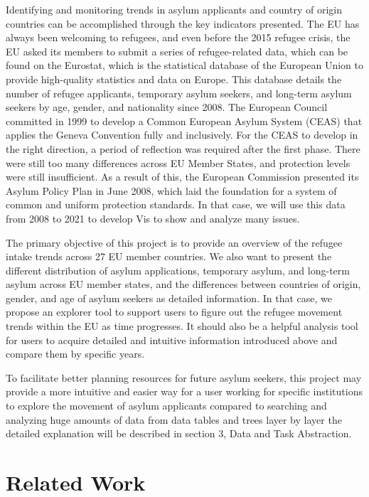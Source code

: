 \documentclass[journal]{vgtc}                %
\begin{document}
Identifying and monitoring trends in asylum applicants and country of origin countries can be accomplished through the key indicators presented\cite{euaa:2022}. The EU has always been welcoming to refugees, and even before the 2015 refugee crisis, the EU asked its members to submit a series of refugee-related data, which can be found on the Eurostat, which is the statistical database of the European Union to provide high-quality statistics and data on Europe. This database details the number of refugee applicants, temporary asylum seekers, and long-term asylum seekers by age, gender, and nationality since 2008. The European Council committed in 1999 to develop a Common European Asylum System (CEAS) that applies the Geneva Convention fully and inclusively. For the CEAS to develop in the right direction, a period of reflection was required after the first phase. There were still too many differences across EU Member States, and protection levels were still insufficient. As a result of this, the European Commission presented its Asylum Policy Plan in June 2008, which laid the foundation for a system of common and uniform protection standards. In that case, we will use this data from 2008 to 2021 to develop Vis to show and analyze many issues. 

The primary objective of this project is to provide an overview of the refugee intake trends across 27 EU member countries. We also want to present the different distribution of asylum applications, temporary asylum, and long-term asylum across EU member states, and the differences between countries of origin, gender, and age of asylum seekers as detailed information. In that case, we propose an explorer tool to support users to figure out the refugee movement trends within the EU as time progresses. It should also be a helpful analysis tool for users to acquire detailed and intuitive information introduced above and compare them by specific years.

To facilitate better planning resources for future asylum seekers, this project may provide a more intuitive and easier way for a user working for specific institutions to explore the movement of asylum applicants compared to searching and analyzing huge amounts of data from data tables and trees layer by layer the detailed explanation will be described in section 3, Data and Task Abstraction.

\section{Related Work}
\end{document}
